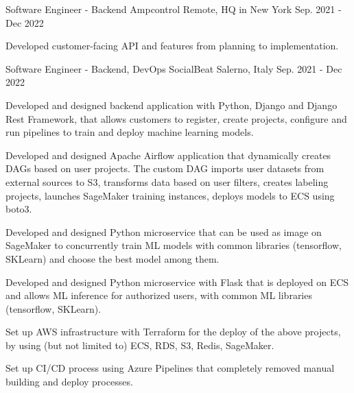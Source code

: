 

\begin{cventries}

  \cventry
    {Software Engineer - Backend} %
    {Ampcontrol} %
    {Remote, HQ in New York} %
    {Sep. 2021 - Dec 2022} %
    {
      \begin{cvitems} %
        \item {Developed customer-facing API and features from planning to implementation.}
      \end{cvitems}
    }

  \cventry
    {Software Engineer - Backend, DevOps} %
    {SocialBeat} %
    {Salerno, Italy} %
    {Sep. 2021 - Dec 2022} %
    {
      \begin{cvitems} %
        \item {Developed and designed backend application with Python, Django and Django Rest Framework, that allows customers to register, create projects, configure and run pipelines to train and deploy machine learning models.}
        \item {Developed and designed Apache Airflow application that dynamically creates DAGs based on user projects. The custom DAG imports user datasets from external sources to S3, transforms data based on user filters, creates labeling projects, launches SageMaker training instances, deploys models to ECS using boto3.}
        \item {Developed and designed Python microservice that can be used as image on SageMaker to concurrently train ML models with common libraries (tensorflow, SKLearn) and choose the best model among them.}
        \item {Developed and designed Python microservice with Flask that is deployed on ECS and allows ML inference for authorized users, with common ML libraries (tensorflow, SKLearn).}
        \item {Set up AWS infrastructure with Terraform for the deploy of the above projects, by using (but not limited to) ECS, RDS, S3, Redis, SageMaker.}
        \item {Set up CI/CD process using Azure Pipelines that completely removed manual building and deploy processes.}
      \end{cvitems}
    }


\end{cventries}
